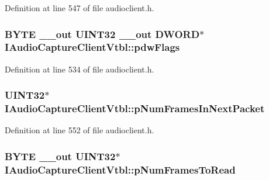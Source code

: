 Definition at line 547 of file audioclient.\+h.

\subsubsection[{\texorpdfstring{pdw\+Flags}{pdwFlags}}]{ {\bf B\+Y\+TE} {\bf \+\_\+\+\_\+out} U\+I\+N\+T32 {\bf \+\_\+\+\_\+out} {\bf D\+W\+O\+RD}$\ast$ I\+Audio\+Capture\+Client\+Vtbl\+::pdw\+Flags}\hypertarget{struct_i_audio_capture_client_vtbl_ac94bbd3f09043f13325bfe9378972a27}{}\label{struct_i_audio_capture_client_vtbl_ac94bbd3f09043f13325bfe9378972a27}


Definition at line 534 of file audioclient.\+h.

\subsubsection[{\texorpdfstring{p\+Num\+Frames\+In\+Next\+Packet}{pNumFramesInNextPacket}}]{ U\+I\+N\+T32$\ast$ I\+Audio\+Capture\+Client\+Vtbl\+::p\+Num\+Frames\+In\+Next\+Packet}\hypertarget{struct_i_audio_capture_client_vtbl_a1cd269f5a9d1e53ab1d91e42df505b68}{}\label{struct_i_audio_capture_client_vtbl_a1cd269f5a9d1e53ab1d91e42df505b68}


Definition at line 552 of file audioclient.\+h.

\subsubsection[{\texorpdfstring{p\+Num\+Frames\+To\+Read}{pNumFramesToRead}}]{ {\bf B\+Y\+TE} {\bf \+\_\+\+\_\+out} U\+I\+N\+T32$\ast$ I\+Audio\+Capture\+Client\+Vtbl\+::p\+Num\+Frames\+To\+Read}\hypertarget{struct_i_audio_capture_client_vtbl_a2ea0f56fbc1dc13df320f4e471dc7502}{}\label{struct_i_audio_capture_client_vtbl_a2ea0f56fbc1dc13df320f4e471dc7502}


